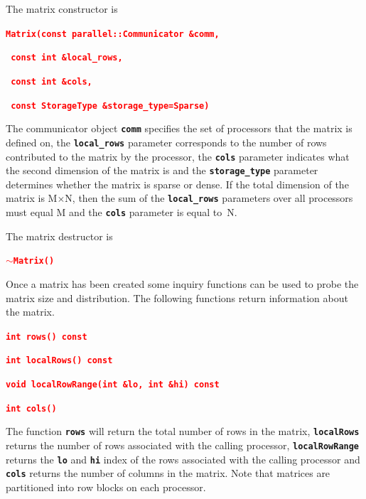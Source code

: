 \documentclass[12pt]{report} %
\begin{document}
The matrix constructor is

\textcolor{red}{\texttt{\textbf{Matrix(const parallel::Communicator \&comm,}}}

\textcolor{red}{\texttt{\textbf{           const int \&local\_rows,}}}

\textcolor{red}{\texttt{\textbf{           const int \&cols,}}}

\textcolor{red}{\texttt{\textbf{           const StorageType \&storage\_type=Sparse)}}}

The communicator object \texttt{\textbf{comm}} specifies the set of processors that the matrix is defined on, the \texttt{\textbf{local\_rows}} parameter corresponds to the number of rows contributed to the matrix by the processor, the \texttt{\textbf{cols}} parameter indicates what the second dimension of the matrix is and the \texttt{\textbf{storage\_type}} parameter determines whether the matrix is sparse or dense. If the total dimension of the matrix is M$\mathrm{\times}$N, then the sum of the \texttt{\textbf{local\_rows}} parameters over all processors must equal M and the \texttt{\textbf{cols}} parameter is equal to~N. 

The matrix destructor is

\textcolor{red}{\texttt{\textbf{$\boldsymbol{\mathrm{\sim}}$Matrix()}}}

Once a matrix has been created some inquiry functions can be used to probe the matrix size and distribution. The following functions return information about the matrix.

\textcolor{red}{\texttt{\textbf{int rows() const}}}

\textcolor{red}{\texttt{\textbf{}}}

\textcolor{red}{\texttt{\textbf{int localRows() const}}}

\textcolor{red}{\texttt{\textbf{}}}

\textcolor{red}{\texttt{\textbf{void localRowRange(int \&lo, int \&hi) const}}}

\textcolor{red}{\texttt{\textbf{}}}

\textcolor{red}{\texttt{\textbf{int cols()}}}

The function \texttt{\textbf{rows}} will return the total number of rows in the matrix, \texttt{\textbf{localRows}} returns the number of rows associated with the calling processor, \texttt{\textbf{localRowRange}} returns the \texttt{\textbf{lo}} and \texttt{\textbf{hi}} index of the rows associated with the calling processor and \texttt{\textbf{cols}} returns the number of columns in the matrix. Note that matrices are partitioned into row blocks on each processor.
\end{document}
